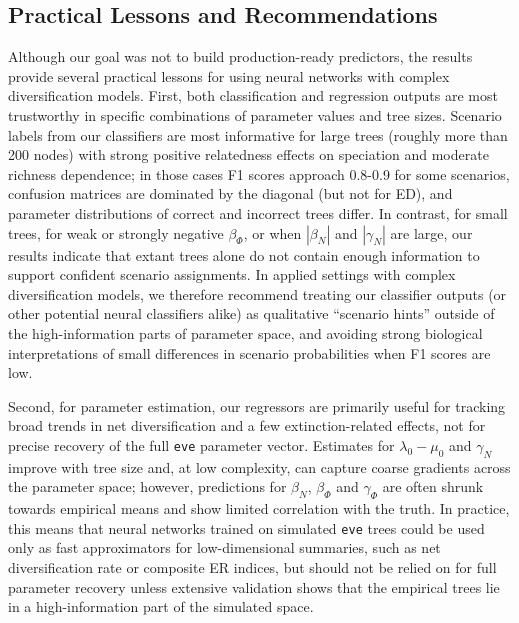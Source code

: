 {\subsection{Practical Lessons and Recommendations}
\label{ch3::sec::discussion::lessons}
Although our goal was not to build production-ready predictors, the results provide several practical lessons for using neural networks with complex diversification models. First, both classification and regression outputs are most trustworthy in specific combinations of parameter values and tree sizes. Scenario labels from our classifiers are most informative for large trees (roughly more than 200 nodes) with strong positive relatedness effects on speciation and moderate richness dependence; in those cases F1 scores approach 0.8-0.9 for some scenarios, confusion matrices are dominated by the diagonal (but not for ED), and parameter distributions of correct and incorrect trees differ. In contrast, for small trees, for weak or strongly negative $\beta_{\varPhi}$, or when $|\beta_N|$ and $|\gamma_N|$ are large, our results indicate that extant trees alone do not contain enough information to support confident scenario assignments. In applied settings with complex diversification models, we therefore recommend treating our classifier outputs (or other potential neural classifiers alike) as qualitative “scenario hints” outside of the high-information parts of parameter space, and avoiding strong biological interpretations of small differences in scenario probabilities when F1 scores are low.

Second, for parameter estimation, our regressors are primarily useful for tracking broad trends in net diversification and a few extinction-related effects, not for precise recovery of the full \texttt{eve} parameter vector. Estimates for $\lambda_0 - \mu_0$ and $\gamma_N$ improve with tree size and, at low complexity, can capture coarse gradients across the parameter space; however, predictions for $\beta_N$, $\beta_{\varPhi}$ and $\gamma_{\varPhi}$ are often shrunk towards empirical means and show limited correlation with the truth. In practice, this means that neural networks trained on simulated \texttt{eve} trees could be used only as fast approximators for low-dimensional summaries, such as net diversification rate or composite ER indices, but should not be relied on for full parameter recovery unless extensive validation shows that the empirical trees lie in a high-information part of the simulated space.

}
